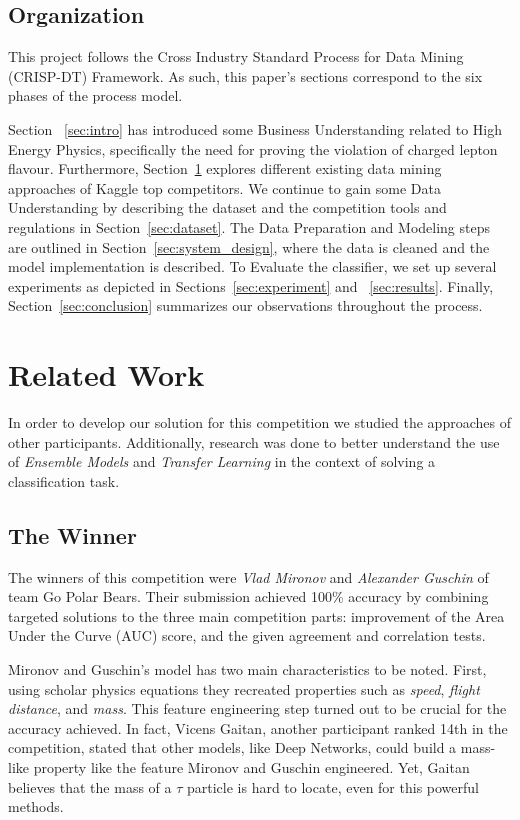 \documentclass[conference]{IEEEtran}
\begin{document}
\subsection{Organization}
This project follows the Cross Industry Standard Process for Data Mining (CRISP-DT) Framework. As such, this paper's sections correspond to the six phases of the process model. 

Section ~\ref{sec:intro} has introduced some Business Understanding related to High Energy Physics, specifically the need for proving the violation of charged lepton flavour. Furthermore, Section~\ref{sec:related_work} explores different existing data mining approaches of Kaggle top competitors. We continue to gain some Data Understanding by describing the dataset and the competition tools and regulations in Section~\ref{sec:dataset}. The Data Preparation and Modeling steps are outlined in Section~\ref{sec:system_design}, where the data is cleaned and the model implementation is described. To Evaluate the classifier, we set up several experiments as depicted in Sections~\ref{sec:experiment} and ~\ref{sec:results}. Finally, Section~\ref{sec:conclusion} summarizes our observations throughout the process.

\section{Related Work}
\label{sec:related_work}
In order to develop our solution for this competition we studied the approaches of other participants. Additionally, research was done to better understand the use of \textit{Ensemble Models} and \textit{Transfer Learning} in the context of solving a classification task.

\subsection{The Winner}
The winners of this competition were \textit{Vlad Mironov} and \textit{Alexander Guschin} of team Go Polar Bears. Their submission achieved 100\% accuracy by combining targeted solutions to the three main competition parts: improvement of the Area Under the Curve (AUC) score, and the given agreement and correlation tests.

Mironov and Guschin's model has two main characteristics to be noted. First, using scholar physics equations they recreated properties such as \textit{speed}, \textit{flight distance}, and \textit{mass}. This feature engineering step turned out to be crucial for the accuracy achieved. In fact, Vicens Gaitan, another participant ranked 14th in the competition, stated that other models, like Deep Networks, could build a mass-like property like the feature Mironov and Guschin engineered. Yet, Gaitan believes that the mass of a $\tau$ particle is hard to locate, even for this powerful methods. 
\end{document}

